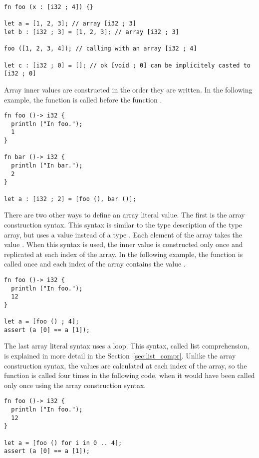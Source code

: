 \begin{lstlisting}[style=coloredverbatim]
fn foo (x : [i32 ; 4]) {}

let a = [1, 2, 3]; // array [i32 ; 3]
let b : [i32 ; 3] = [1, 2, 3]; // array [i32 ; 3]

foo ([1, 2, 3, 4]); // calling with an array [i32 ; 4]

let c : [i32 ; 0] = []; // ok [void ; 0] can be implicitely casted to [i32 ; 0]
\end{lstlisting}

Array inner values are constructed in the order they are written. In the
following example, the function  is called before the function
.

\begin{lstlisting}[style=coloredverbatim]
fn foo ()-> i32 {
  println ("In foo.");
  1
}

fn bar ()-> i32 {
  println ("In bar.");
  2
}

let a : [i32 ; 2] = [foo (), bar ()];
\end{lstlisting}

There are two other ways to define an array literal value. The first is the
array construction syntax. This syntax is similar to the type description of the
type array, but uses a value instead of a type \token{[V ; N]}. Each element of
the array takes the value . When this syntax is used, the inner value
is constructed only once and replicated at each index of the array. In the
following example, the function  is called once and each index of
the array contains the value .

\begin{lstlisting}[style=coloredverbatim]
fn foo ()-> i32 {
  println ("In foo.");
  12
}

let a = [foo () ; 4];
assert (a [0] == a [1]);
\end{lstlisting}

\smallskip
The last array literal syntax uses a  loop. This syntax, called list
comprehension, is explained in more detail in the Section~\ref{sec:list_compr}.
Unlike the array construction syntax, the values are calculated at each index of
the array, so the function is called four times in the following code, when it
would have been called only once using the array construction syntax.

\begin{lstlisting}[style=coloredverbatim]
fn foo ()-> i32 {
  println ("In foo.");
  12
}

let a = [foo () for i in 0 .. 4];
assert (a [0] == a [1]);
\end{lstlisting}


